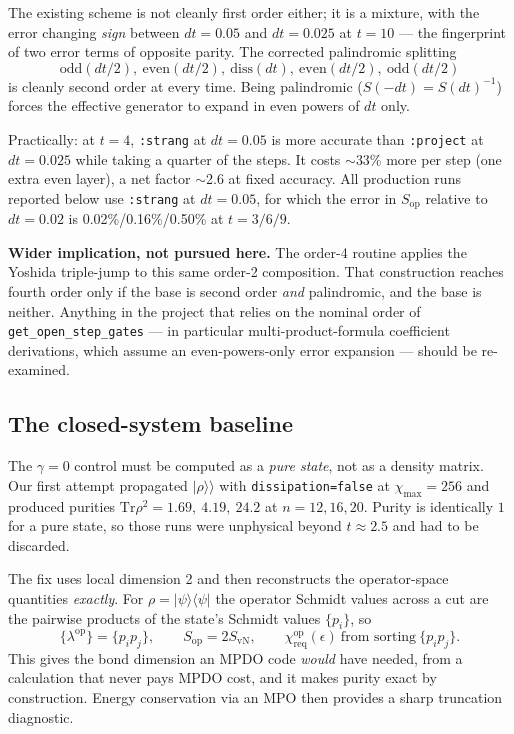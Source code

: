 \documentclass[11pt,a4paper]{article}
\newcommand{\Sop}{S_{\mathrm{op}}}
\newcommand{\chreq}{\chi_{\mathrm{req}}}
\begin{document}
The existing scheme is not cleanly first order either; it is a mixture, with the
error changing \emph{sign} between $dt=0.05$ and $dt=0.025$ at $t=10$ --- the
fingerprint of two error terms of opposite parity. The corrected palindromic
splitting
\begin{equation*}
  \mathrm{odd}(dt/2),\ \mathrm{even}(dt/2),\ \mathrm{diss}(dt),\
  \mathrm{even}(dt/2),\ \mathrm{odd}(dt/2)
\end{equation*}
is cleanly second order at every time. Being palindromic ($S(-dt)=S(dt)^{-1}$)
forces the effective generator to expand in even powers of $dt$ only.

Practically: at $t=4$, \texttt{:strang} at $dt=0.05$ is more accurate than
\texttt{:project} at $dt=0.025$ while taking a quarter of the steps. It costs
$\sim$33\% more per step (one extra even layer), a net factor $\sim$2.6 at fixed
accuracy. All production runs reported below use \texttt{:strang} at $dt=0.05$,
for which the error in $\Sop$ relative to $dt=0.02$ is
0.02\%/0.16\%/0.50\% at $t=3/6/9$.

\begin{warnbox}
\textbf{Wider implication, not pursued here.} The order-4 routine applies the
Yoshida triple-jump to this same order-2 composition. That construction reaches
fourth order only if the base is second order \emph{and} palindromic, and the
base is neither. Anything in the project that relies on the nominal order of
\texttt{get\_open\_step\_gates} --- in particular multi-product-formula
coefficient derivations, which assume an even-powers-only error expansion ---
should be re-examined.
\end{warnbox}

\subsection{The closed-system baseline}

The $\gamma=0$ control must be computed as a \emph{pure state}, not as a density
matrix. Our first attempt propagated $|\rho\rangle\rangle$ with
\texttt{dissipation=false} at $\chi_{\max}=256$ and produced purities
$\mathrm{Tr}\rho^2 = 1.69,\ 4.19,\ 24.2$ at $n=12,16,20$. Purity is identically
$1$ for a pure state, so those runs were unphysical beyond $t\approx2.5$ and had
to be discarded.

The fix uses local dimension 2 and then reconstructs the operator-space
quantities \emph{exactly}. For $\rho=|\psi\rangle\langle\psi|$ the operator
Schmidt values across a cut are the pairwise products of the state's Schmidt
values $\{p_i\}$, so
\begin{equation}
  \{\lambda^{\mathrm{op}}\} = \{p_ip_j\},\qquad
  \Sop = 2S_{\mathrm{vN}},\qquad
  \chreq^{\mathrm{op}}(\epsilon)\ \text{from sorting}\ \{p_ip_j\}.
  \label{eq:pureop}
\end{equation}
This gives the bond dimension an MPDO code \emph{would} have needed, from a
calculation that never pays MPDO cost, and it makes purity exact by
construction. Energy conservation via an MPO then provides a sharp truncation
diagnostic.
\end{document}
